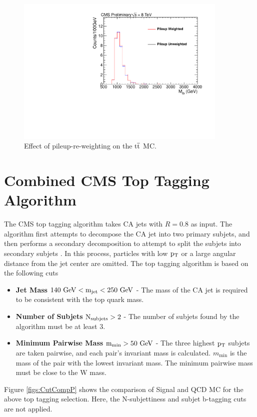 \begin{figure}[htcb]
\centering
\includegraphics[width=0.9\textwidth]{AN-13-004/figs/TTbar_PileupComp.pdf}
\caption{Effect of pileup-re-weighting on the $\mathrm{t\overline{t}}$ MC.}
\label{figs:pileup3ttbar}
\end{figure}



\section{Combined CMS Top Tagging Algorithm}
\label{sec:toptagging}
\label{sec:subjetSF}

The CMS top tagging algorithm takes CA jets with $R = 0.8$ as input.  
The algorithm first attempts to decompose the CA jet into two primary subjets, and then 
performs a secondary decomposition to attempt to split the subjets into secondary subjets \cite{JME13007}.
In this process, particles with low $\mathrm{p_{T}}$ or a large angular distance from the jet center are omitted.
The top tagging algorithm is based on the following cuts

\begin{itemize}
\item {\bf Jet Mass}  $\mathrm{\boldmath 140~\mathrm{GeV} < m_{\text{jet}} < 250~\mathrm{GeV}}$ - The mass of the CA jet is required to be consistent with the top quark mass. 
\item {\bf Number of Subjets}  $\mathrm{\boldmath N_{\text{subjets}} > 2}$ - The number of subjets found by the algorithm must be at least 3.
\item {\bf Minimum Pairwise Mass} $\mathrm{\boldmath m_{\text{min}} > 50~\mathrm{GeV}}$  - The three highest $\mathrm{p_{T}}$ subjets are
taken pairwise, and each pair's invariant mass is calculated. $m_{\text{min}}$ is the mass of the pair with the lowest invariant mass. The minimum pairwise mass must be close to the W mass.   
\end{itemize}
Figure \ref{figs:CutCompP} shows the comparison of Signal and QCD MC for the above top tagging selection. Here, the N-subjettiness and subjet b-tagging cuts are not applied.

